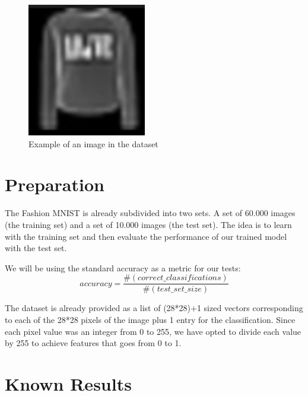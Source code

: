 \documentclass[twoside,twocolumn]{article}
\begin{document}
    \begin{figure}[h]
    \begin{center}
        \includegraphics[scale=0.8]{fashionExample.png}
        \caption{Example of an image in the dataset\label{fig:fashionex}}
    \end{center}
    \end{figure}


\section{Preparation}

The Fashion MNIST is already subdivided into two sets. A set of 60.000 images (the training set)
and a set of 10.000 images (the test set). The idea is to learn with the training set and then
evaluate the performance of our trained model with the test set.

We will be using the standard accuracy as a metric for our tests:
\begin{equation}
\label{eq:acc}
accuracy = \frac{\#(correct\_classifications)}{\#(test\_set\_size)}
\end{equation}

The dataset is already provided as a list of (28*28)+1 sized vectors corresponding
to each of the 28*28 pixels of the image plus 1 entry for the classification.
Since each pixel value was an integer from 0 to 255, we have opted to divide
each value by 255 to achieve features that goes from 0 to 1.


\section{Known Results}
\end{document}
